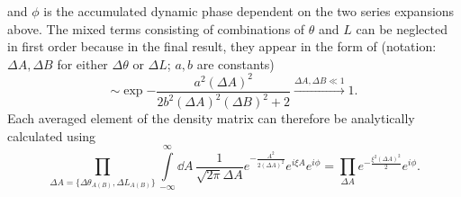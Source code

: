 and $\phi$ is the accumulated dynamic phase dependent on the two series expansions above.
The mixed terms consisting of combinations of $\theta$ and $L$ can be neglected in first order because in the final result, they appear in the form of (notation: $\Delta A,\Delta B$ for either $\Delta\theta$ or $\Delta L$; $a,b$ are constants)
\begin{equation}
  \sim \exp{-\frac{a^2(\Delta A)^2}{2b^2(\Delta A)^2(\Delta B)^2 + 2}} \xrightarrow{\Delta A,\Delta B \ll 1} 1 .
\end{equation}
Each averaged element of the density matrix can therefore be analytically calculated using 
\begin{equation}
  \prod_{\Delta A = \{\Delta \theta_{A(B)}, \Delta L_{A(B)}\}} \int\limits_{-\infty}^{\infty} \dd A \, \frac{1}{\sqrt{2\pi}\Delta A} e^{-\frac{A^2}{2 (\Delta A)^2}} e^{i\xi A} e^{i\phi} = \prod_{\Delta A} e^{-\frac{\xi^2 (\Delta A)^2}{2}} e^{i\phi} .
\end{equation}


